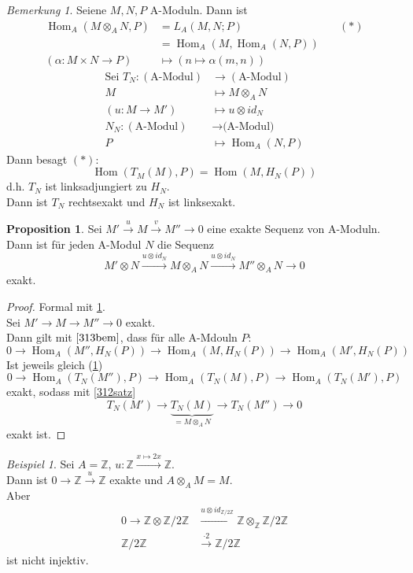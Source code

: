 \documentclass[10pt,a4paper]{article}
\newcommand{\Z}{\ensuremath{\mathbb{Z}}}
\newcommand{\al}{\ensuremath{\alpha}}
\newcommand{\Hom}{\operatorname{Hom}}
\newcounter{thm}[section]
\theoremstyle{definition}
\newtheorem{prop}[thm]{Proposition}
\theoremstyle{plain}
\theoremstyle{remark}
\newtheorem{bem}[thm]{Bemerkung}
\newtheorem{exm}[thm]{Beispiel}
\begin{document}
\begin{bem}
	\label{313bem}
	Seiene $M,N,P$ A-Moduln. Dann ist
	\begin{align*}
	\Hom_A(M\otimes_A N,P)&=L_A(M,N;P)&\quad (*)\\
	&=\Hom_A(M,\Hom_A(N,P))\\
	(\al:M\times N\rightarrow P)&\mapsto (n\mapsto \al(m,n))
	\end{align*}
	\begin{align*}
	\text{Sei }T_N:(\text{A-Modul})&\rightarrow (\text{A-Modul})\\
	M&\mapsto M\otimes_AN\\
	(u:M\rightarrow M')&\mapsto u\otimes id_N\\
	N_N:(\text{A-Modul})&\rightarrow \text{(A-Modul)}\\
	P&\mapsto \Hom_A(N,P)
	\end{align*}
	Dann besagt $(*)$:
	\[\Hom(T_M(M),P)=\Hom(M,H_N(P))\]
	d.h. $T_N$ ist linksadjungiert zu $H_N$.\\
	Dann ist $T_N$ rechtsexakt und $H_N$ ist linksexakt.
\end{bem}
\begin{prop}
	Sei $M'\xrightarrow{u}M\xrightarrow{v}M''\rightarrow 0$ eine exakte Sequenz von A-Moduln. Dann ist für jeden A-Modul $N$ die Sequenz
	\[M'\otimes N\xrightarrow{u\otimes id_N}M\otimes_AN\xrightarrow{u\otimes id_N}M''\otimes_A N\rightarrow 0\]
	exakt.
\end{prop}
\begin{proof}
	Formal mit \ref{313bem}.\\
	Sei $M'\rightarrow M \rightarrow M''\rightarrow 0$ exakt.\\
	Dann gilt mit $\ref{313bem}$, dass für alle A-Mdouln $P$:
	\[0\rightarrow \Hom_A(M'',H_N(P))\rightarrow \Hom_A(M,H_N(P))\rightarrow \Hom_A(M',H_N(P))\]
	Ist jeweils gleich (\ref{313bem})
	\[0\rightarrow \Hom_A(T_N(M''),P)\rightarrow \Hom_A(T_N(M),P)\rightarrow \Hom_A(T_N(M'),P)\]
	exakt, sodass mit \ref{312satz}
	\[T_N(M')\rightarrow \underbrace{T_N(M)}_{=M\otimes_AN}\rightarrow T_N(M'')\rightarrow 0\]
	exakt ist.
\end{proof}
\begin{exm}
	Sei $A=\Z$, $u:\Z\xrightarrow{x\mapsto2x}\Z$. \\
	Dann ist $0\rightarrow \Z\xrightarrow{u}\Z$ exakte und $A\otimes_A M=M$.\\
	Aber 
	\begin{align*}
	0\rightarrow \Z\otimes\Z/2\Z&\xrightarrow{u\otimes id_{\Z/2\Z}}\Z\otimes_\Z\Z/2\Z\\
	\Z/2\Z&\xrightarrow{\cdot 2}\Z/2\Z
	\end{align*}
	ist nicht injektiv.
\end{exm}
\end{document}
